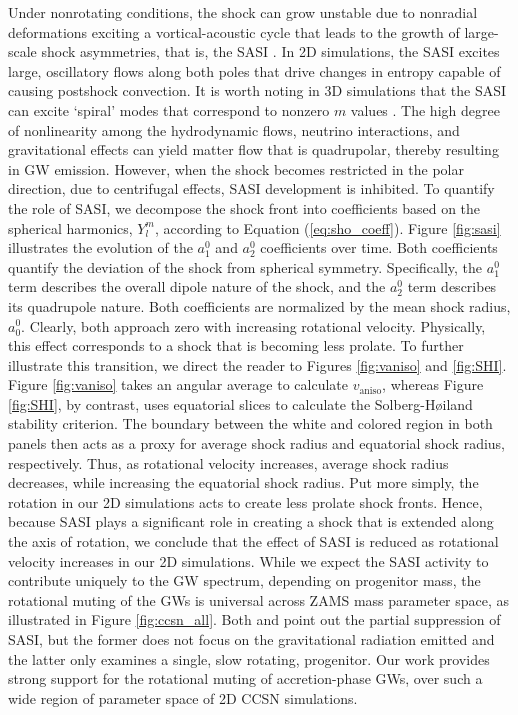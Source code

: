 \documentclass[twocolumn,times]{aastex62}  %
\begin{document}
Under nonrotating conditions, the shock can grow unstable due to nonradial deformations exciting a vortical-acoustic cycle that leads to the growth of large-scale shock asymmetries, that is, the SASI \citep{blondin:2003, blondin:2006, scheck:2008,marek:2009a}.
In 2D simulations, the SASI excites large, oscillatory flows along both poles that drive changes in entropy capable of causing postshock convection.  It is worth noting in 3D simulations that the SASI can excite `spiral' modes that correspond to nonzero $m$ values \citep{blondin:2007,kuroda:2016}.  The high degree of nonlinearity among the hydrodynamic flows, neutrino interactions, and gravitational effects can yield matter flow that is quadrupolar, thereby resulting in GW emission.  However, when the shock becomes restricted in the polar direction, due to centrifugal effects, SASI development is inhibited.  To quantify the role of SASI, we decompose the shock front into coefficients based on the spherical harmonics, $Y_l^m$, according to Equation (\ref{eq:sho_coeff}). Figure \ref{fig:sasi} illustrates the evolution of the $a_1^0$ and $a_2^0$ coefficients over time.  Both coefficients quantify the deviation of the shock from spherical symmetry.  Specifically, the $a_1^0$ term describes the overall dipole nature of the shock, and the $a_2^0$ term describes its quadrupole nature.  Both coefficients are normalized by the mean shock radius, $a^0_0$.  Clearly, both approach zero with increasing rotational velocity.  Physically, this effect corresponds to a shock that is becoming less prolate.  To further illustrate this transition, we direct the reader to Figures \ref{fig:vaniso} and \ref{fig:SHI}.  Figure \ref{fig:vaniso} takes an angular average to calculate $v_{\mathrm{aniso}}$, whereas Figure \ref{fig:SHI}, by contrast, uses equatorial slices  to calculate the Solberg-H{\o}iland stability criterion.  The boundary between the white and colored region in both panels then acts as a proxy for average shock radius and equatorial shock radius, respectively.  Thus, as rotational velocity increases, average shock radius decreases, while increasing the equatorial shock radius.  Put more simply, the rotation in our 2D simulations acts to create less prolate shock fronts.  Hence, because SASI plays a significant role in creating a shock that is extended along the axis of rotation, we conclude that the effect of SASI is reduced as rotational velocity increases in our 2D simulations.
While we expect the SASI activity to contribute uniquely to the GW spectrum, depending on progenitor mass, the rotational muting of the GWs is universal across ZAMS mass parameter space, as illustrated in Figure \ref{fig:ccsn_all}. 
Both \citet{burrows:2007}  and \citet{moro:2018} point out the partial suppression of SASI, but the former does not focus on the gravitational radiation emitted and the latter only examines a single, slow rotating, progenitor.  Our work provides strong support for the rotational muting of accretion-phase GWs, over such a wide region of parameter space of 2D CCSN simulations. 
 
\end{document}
